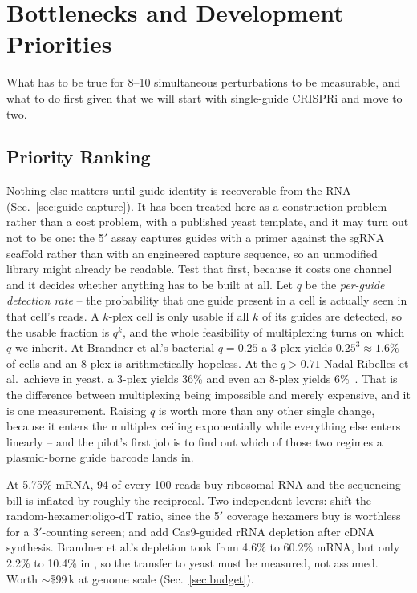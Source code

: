 
\section{Bottlenecks and Development Priorities}
\label{sec:bottlenecks}

What has to be true for 8--10 simultaneous perturbations to be measurable, and
what to do first given that we will start with single-guide CRISPRi and move to
two.

\subsection{Priority Ranking}
\label{sec:ranked}

 Nothing else matters until guide identity is
recoverable from the RNA (Sec.~\ref{sec:guide-capture}). It has been treated here
as a construction problem rather than a cost problem, with a published yeast
template, and it may turn out not to be one: the 5$'$ assay captures guides with
a primer against the sgRNA scaffold rather than with an engineered capture
sequence, so an unmodified library might already be readable. Test that first,
because it costs one channel and it decides whether anything has to be built at
all. Let $q$ be the \emph{per-guide detection rate} -- the probability that
one guide present in a cell is actually seen in that cell's reads. A $k$-plex cell
is only usable if all $k$ of its guides are detected, so the usable fraction is
$q^{k}$, and the whole feasibility of multiplexing turns on which $q$ we inherit.
At Brandner et al.'s bacterial $q=0.25$ a 3-plex yields $0.25^{3}\approx1.6\%$ of
cells and an 8-plex is arithmetically hopeless. At the $q>0.71$ Nadal-Ribelles et
al.\ achieve in yeast, a 3-plex yields 36\% and even an 8-plex yields
6\%~\citep{nadal-ribellesSinglecellResolvedGenotypephenotype2025}. That is the
difference between multiplexing being impossible and merely expensive, and it is
one measurement. Raising $q$ is worth more than any other single change, because
it enters the multiplex ceiling exponentially while everything else enters
linearly -- and the pilot's first job is to find out which of those two regimes a
plasmid-borne guide barcode lands in.

 At 5.75\% mRNA, 94 of every 100 reads buy ribosomal RNA
and the sequencing bill is inflated by roughly the reciprocal. Two independent
levers: shift the random-hexamer:oligo-dT ratio, since the 5$'$ coverage hexamers
buy is worthless for a 3$'$-counting screen; and add Cas9-guided rRNA depletion
after cDNA synthesis. Brandner et al.'s depletion took  from 4.6\% to
60.2\% mRNA, but only 2.2\% to 10.4\% in , so the transfer to
yeast must be measured, not assumed. Worth $\sim$\$99\,k at genome scale
(Sec.~\ref{sec:budget}).

